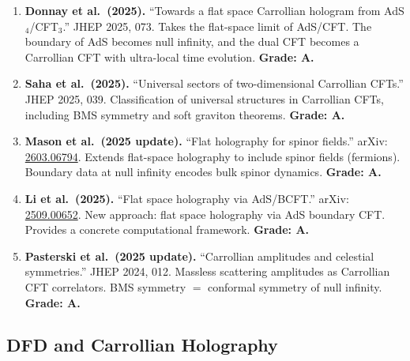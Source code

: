 \documentclass[11pt,a4paper]{article}
\begin{document}
\begin{enumerate}
\item \textbf{Donnay et al.\ (2025).} ``Towards a flat space Carrollian hologram from AdS$_4$/CFT$_3$.'' JHEP 2025, 073. Takes the flat-space limit of AdS/CFT. The boundary of AdS becomes null infinity, and the dual CFT becomes a Carrollian CFT with ultra-local time evolution. \textbf{Grade: A.}

\item \textbf{Saha et al.\ (2025).} ``Universal sectors of two-dimensional Carrollian CFTs.'' JHEP 2025, 039. Classification of universal structures in Carrollian CFTs, including BMS symmetry and soft graviton theorems. \textbf{Grade: A.}

\item \textbf{Mason et al.\ (2025 update).} ``Flat holography for spinor fields.'' arXiv: \href{https://arxiv.org/abs/2603.06794}{2603.06794}. Extends flat-space holography to include spinor fields (fermions). Boundary data at null infinity encodes bulk spinor dynamics. \textbf{Grade: A.}

\item \textbf{Li et al.\ (2025).} ``Flat space holography via AdS/BCFT.'' arXiv: \href{https://arxiv.org/abs/2509.00652}{2509.00652}. New approach: flat space holography via AdS boundary CFT. Provides a concrete computational framework. \textbf{Grade: A.}

\item \textbf{Pasterski et al.\ (2025 update).} ``Carrollian amplitudes and celestial symmetries.'' JHEP 2024, 012. Massless scattering amplitudes as Carrollian CFT correlators. BMS symmetry $=$ conformal symmetry of null infinity. \textbf{Grade: A.}
\end{enumerate}

\subsection{DFD and Carrollian Holography}
\end{document}
